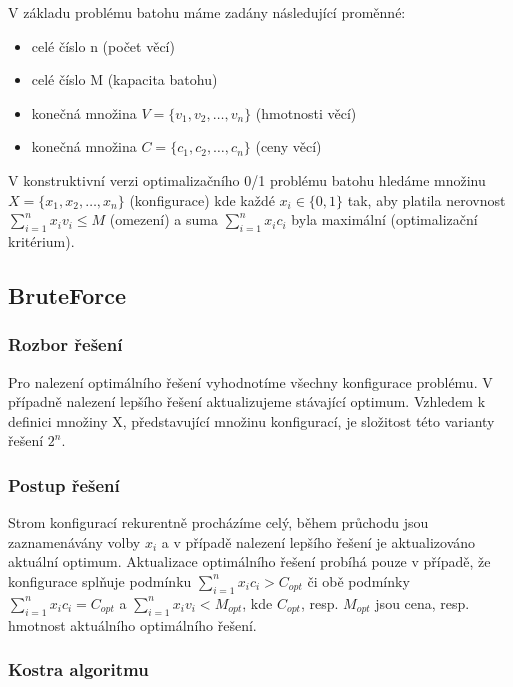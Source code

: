 \documentclass[12pt]{article}
\begin{document}
V základu problému batohu máme zadány následující proměnné: 

\begin{itemize}
    \item celé číslo n (počet věcí)
    \item celé číslo M (kapacita batohu) 
    \item konečná množina \( V=\{v_1,v_2,…,v_n\} \) (hmotnosti věcí) 
    \item konečná množina \( C=\{c_1,c_2,…,c_n\} \) (ceny věcí)
\end{itemize}

V konstruktivní verzi optimalizačního 0/1 problému batohu hledáme množinu \( X=\{x_1,x_2,…,x_n\} \) (konfigurace) kde každé \( x_i \in \{0,1\} \) tak, aby platila nerovnost \( \sum_{i=1}^{n} x_i v_i \leq M \) (omezení) a suma \( \sum_{i=1}^{n} x_i c_i \) byla maximální (optimalizační kritérium).

\subsection{BruteForce}

\subsubsection{Rozbor řešení}

Pro nalezení optimálního řešení vyhodnotíme všechny konfigurace problému. V případně nalezení lepšího řešení aktualizujeme stávající optimum. Vzhledem k definici množiny X, představující množinu konfigurací, je složitost této varianty řešení $2^n$.

\subsubsection{Postup řešení}

Strom konfigurací rekurentně procházíme celý, během průchodu jsou zaznamenávány volby $x_i$ a v případě nalezení lepšího řešení je aktualizováno aktuální optimum. Aktualizace optimálního řešení probíhá pouze v případě, že konfigurace splňuje podmínku $ \sum_{i=1}^{n} x_i c_i > C_{opt} $ či obě podmínky $ \sum_{i=1}^{n} x_i c_i = C_{opt} $ a $\sum_{i=1}^{n} x_i v_i < M_{opt}$, kde $C_{opt}$, resp. $M_{opt}$ jsou cena, resp. hmotnost aktuálního optimálního řešení.

\newpage

\subsubsection{Kostra algoritmu}
\end{document}

